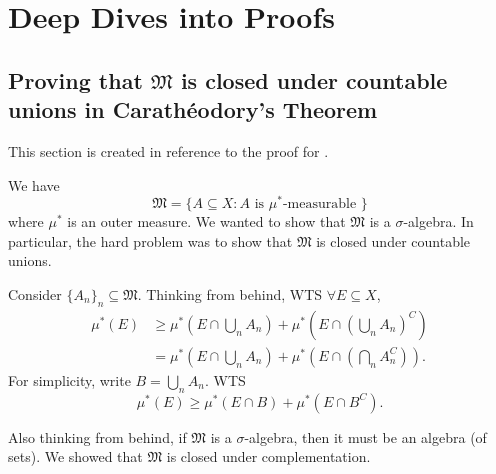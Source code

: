 \documentclass[notoc,notitlepage]{tufte-book}
\begin{document}


\appendix

\chapter{Deep Dives into Proofs}%
\label{chp:deep_dives_into_proofs}

\section{Proving that \texorpdfstring{$\mathfrak{M}$}{M} is closed under countable unions in Carath\'{e}odory's Theorem}\label{sec:proving_that_m_is_closed_under_countable_unions_in_caratheodory_s_theorem}

This section is created in reference to
the proof for .

We have
\begin{equation*}
  \mathfrak{M} = \{ A \subseteq X : A \text{ is } \mu^*\text{-measurable } \}
\end{equation*}
where $\mu^*$ is an outer measure.
We wanted to show that $\mathfrak{M}$ is a $\sigma$-algebra.
In particular, the hard problem was to show that
$\mathfrak{M}$ is closed under countable unions.

Consider $\{ A_n \}_{n} \subseteq \mathfrak{M}$.
Thinking from behind, WTS $\forall E \subseteq X$,
\begin{align*}
  \mu^*(E)
  &\geq \mu^* \left( E \cap \bigcup_{n} A_n \right)
    + \mu^* \left( E \cap \left( \bigcup_{n} A_n \right)^C \right) \\
  &= \mu^* \left( E \cap \bigcup_{n} A_n \right)
    + \mu^* \left( E \cap \left( \bigcap_{n} A_n^C \right) \right).
\end{align*}
For simplicity, write $B = \bigcup_{n} A_n$.
WTS
\begin{equation}\tag{$*$}\label{eq:appendix_1_eq_1}
  \mu^*(E) \geq \mu^*(E \cap B) + \mu^*(E \cap B^C).
\end{equation}

Also thinking from behind,
if $\mathfrak{M}$ is a $\sigma$-algebra, 
then it must be an algebra (of sets).
We showed that $\mathfrak{M}$ is closed under complementation.
\end{document}
